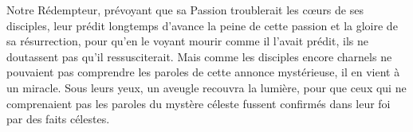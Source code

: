 Notre Rédempteur,
		prévoyant que sa Passion troublerait les cœurs de ses disciples,
	leur prédit longtemps d’avance la peine de cette passion
		et la gloire de sa résurrection,
	pour qu’en le voyant mourir comme il l’avait prédit,
	ils ne doutassent pas qu’il ressusciterait.
Mais comme les disciples encore charnels
	ne pouvaient pas comprendre les paroles de cette annonce mystérieuse,
	il en vient à un miracle.
Sous leurs yeux, un aveugle recouvra la lumière,
	pour que ceux qui ne comprenaient pas les paroles du mystère céleste
	fussent confirmés dans leur foi par des faits célestes.
